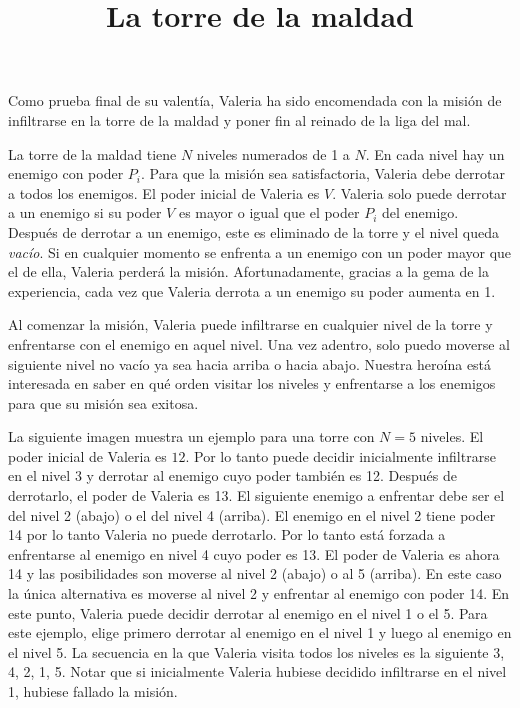\documentclass{oci}
\title{La torre de la maldad}
\begin{document}
\begin{problemDescription}
  Como prueba final de su valentía, Valeria ha sido encomendada con la misión de infiltrarse en la
  torre de la maldad y poner fin al reinado de la liga del mal.

  La torre de la maldad tiene $N$ niveles numerados de 1 a $N$.
  En cada nivel hay un enemigo con poder $P_i$.
  Para que la misión sea satisfactoria, Valeria debe derrotar a todos los enemigos.
  El poder inicial de Valeria es $V$.
  Valeria solo puede derrotar a un enemigo si su poder $V$ es mayor o igual que el poder $P_i$
  del enemigo.
  Después de derrotar a un enemigo, este es eliminado de la torre y el nivel queda \emph{vacío}.
  Si en cualquier momento se enfrenta a un enemigo con un poder mayor que el de ella, Valeria perderá
  la misión.
  Afortunadamente, gracias a la gema de la experiencia, cada vez que Valeria derrota a un enemigo
  su poder aumenta en 1.

  Al comenzar la misión, Valeria puede infiltrarse en cualquier nivel de la torre y
  enfrentarse con el enemigo en aquel nivel.
  Una vez adentro, solo puedo moverse al siguiente nivel no vacío ya sea hacia arriba o hacia abajo.
  Nuestra heroína está interesada en saber en qué orden visitar los niveles y enfrentarse a los enemigos
  para que su misión sea exitosa.

  La siguiente imagen muestra un ejemplo para una torre con $N=5$ niveles.
  El poder inicial de Valeria es $12$.
  Por lo tanto puede decidir inicialmente infiltrarse en el nivel 3 y derrotar al enemigo cuyo poder también es 12.
  Después de derrotarlo, el poder de Valeria es 13.
  El siguiente enemigo a enfrentar debe ser el del nivel 2 (abajo) o el del nivel 4 (arriba).
  El enemigo en el nivel 2 tiene poder 14 por lo tanto Valeria no puede derrotarlo.
  Por lo tanto está forzada a enfrentarse al enemigo en nivel 4 cuyo poder es 13.
  El poder de Valeria es ahora 14 y las posibilidades son moverse al nivel 2 (abajo) o al 5 (arriba).
  En este caso la única alternativa es moverse al nivel 2 y enfrentar al enemigo con poder 14.
  En este punto, Valeria puede decidir derrotar al enemigo en el nivel 1 o el 5.
  Para este ejemplo, elige primero derrotar al enemigo en el nivel 1 y luego al enemigo en el nivel 5.
  La secuencia en la que Valeria visita todos los niveles es la siguiente 3, 4, 2, 1, 5.
  Notar que si inicialmente Valeria hubiese decidido infiltrarse en el nivel 1, hubiese
  fallado la misión.

  \begin{center}
\end{center}
\end{problemDescription}
\end{document}
